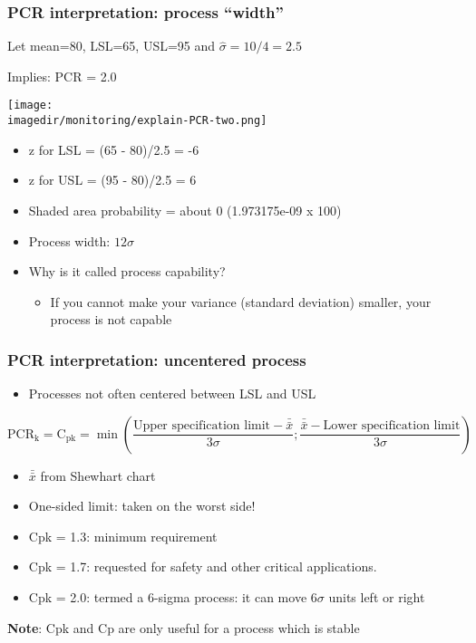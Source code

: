 \begin{frame}\frametitle{PCR interpretation: process ``width''}

	Let mean=80, LSL=65, USL=95 and $\hat{\sigma} = 10/4 = 2.5$

	Implies: PCR = 2.0
	\begin{center}
		\texttt{[image: \\imagedir/monitoring/explain-PCR-two.png]}
	\end{center}
	\begin{itemize}
		\item	z for LSL = (65 - 80)/2.5 = -6
		\item	z for USL = (95 - 80)/2.5 = 6
		\item	Shaded area probability = about 0 (1.973175e-09 x 100)
		\item	Process width: $12 \sigma$
		\item	Why is it called process capability?
		\begin{itemize}
			\item	If you cannot make your variance (standard deviation) smaller, your process is not capable
		\end{itemize}
	\end{itemize}
\end{frame}

\begin{frame}\frametitle{PCR interpretation: uncentered process}
	\begin{itemize}
		\item	Processes not often centered between LSL and USL
	\end{itemize}

	$ \text{PCR}_\text{k} = \text{C}_\text{pk} = \min \left( \dfrac{\text{Upper specification limit} - \bar{\bar{x}}}{3\sigma}; \dfrac{\bar{\bar{x}} - \text{Lower specification limit}}{3\sigma} \right) $
	\begin{itemize}
		\item	$\bar{\bar{x}}$ from Shewhart chart
		\item	One-sided limit: taken on the worst side!
		\item	Cpk = 1.3: minimum requirement
		\item	Cpk = 1.7: requested for safety and other critical applications.
		\item	Cpk = 2.0: termed a 6-sigma process: it can move $6\sigma$ units left or right
	\end{itemize}

	\textbf{Note}: Cpk and Cp are only useful for a process which is stable
\end{frame}

